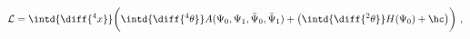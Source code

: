 \begin{equation}
  \label{eq:intro1}
  \mathcal{L} = \intd{\diff{^4x}} \biggl( \intd{\diff{^4 \theta}} A(\Psi_0,\Psi_1 , \bar{\Psi}_0, \bar{\Psi}_1) + \bigl(
  \intd{\diff{^2 \theta}} H(\Psi_0) + \hc \bigr) \biggr) \ ,
\end{equation}

